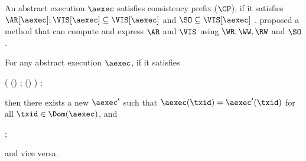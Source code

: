 An abstract execution \( \aexec \) satisfies consistency prefix (\(\CP\)), 
if it satisfies \( \AR[\aexec] ; \VIS[\aexec] \subseteq \VIS[\aexec] \) and \( \SO \subseteq \VIS[\aexec] \) \citep{giovanni_concur16}.
\citet{SIanalysis} proposed a method that can compute  and express \( \AR \) and \( \VIS \)
using \( \WR, \WW, \RW \) and \( \SO \).

\begin{theorem}
\label{thm:cp-eauiv-spec}
For any abstract execution \( \aexec \),
if it satisfies 
\begin{Formulae}
\begin{Formula}
    \left( (\SO \cup \WR[\aexec] ) ; \Refl(\RW[\aexec]) \cup \WW[\aexec] \right) ; \VIS[\aexec] \subseteq \VIS[\aexec]
    \qquad \SO \subseteq \VIS[\aexec]
    \label{equ:kvstore-cp-spec}
\end{Formula}
\end{Formulae}
then there exists a new \( \aexec' \) such that \( \aexec(\txid) = \aexec'(\txid) \)
for all \( \txid \in \Dom(\aexec) \), and
\begin{Formulae}
\begin{Formula}
    \AR[\aexec'] ; \VIS[\aexec'] \subseteq \VIS[\aexec']  \qquad \SO \subseteq \VIS[\aexec'] 
    \label{equ:aexec-cp-spec}
\end{Formula}
\end{Formulae}
and vice versa.
\end{theorem}
